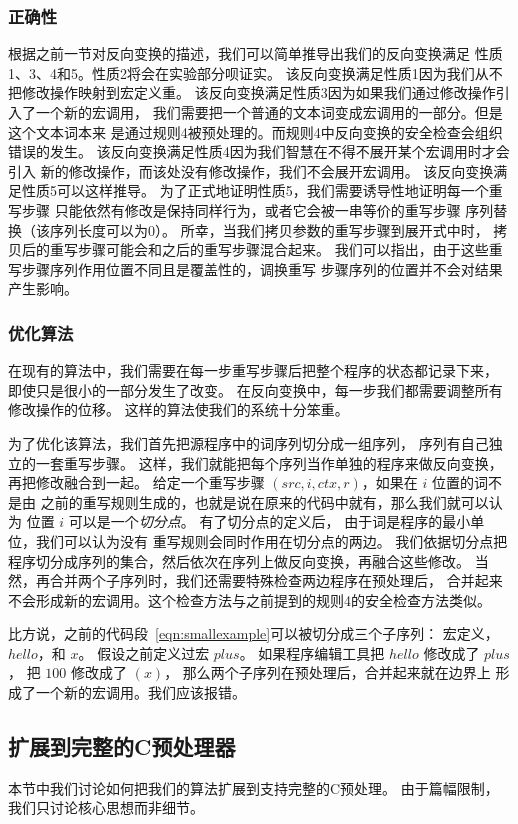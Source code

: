 \subsubsection{正确性}\label{sec:correctness}
根据之前一节对反向变换的描述，我们可以简单推导出我们的反向变换满足
性质1、3、4和5。性质2将会在实验部分呗证实。
该反向变换满足性质1因为我们从不把修改操作映射到宏定义重。
该反向变换满足性质3因为如果我们通过修改操作引入了一个新的宏调用，
我们需要把一个普通的文本词变成宏调用的一部分。但是这个文本词本来
是通过规则4被预处理的。而规则4中反向变换的安全检查会组织错误的发生。
该反向变换满足性质4因为我们智慧在不得不展开某个宏调用时才会引入
新的修改操作，而该处没有修改操作，我们不会展开宏调用。
该反向变换满足性质5可以这样推导。
为了正式地证明性质5，我们需要诱导性地证明每一个重写步骤
只能依然有修改是保持同样行为，或者它会被一串等价的重写步骤
序列替换（该序列长度可以为0）。
所幸，当我们拷贝参数的重写步骤到展开式中时，
拷贝后的重写步骤可能会和之后的重写步骤混合起来。
我们可以指出，由于这些重写步骤序列作用位置不同且是覆盖性的，调换重写
步骤序列的位置并不会对结果产生影响。

\subsubsection{优化算法}\label{sec:optimization}
在现有的算法中，我们需要在每一步重写步骤后把整个程序的状态都记录下来，
即使只是很小的一部分发生了改变。
在反向变换中，每一步我们都需要调整所有修改操作的位移。
这样的算法使我们的系统十分笨重。

为了优化该算法，我们首先把源程序中的词序列切分成一组序列，
序列有自己独立的一套重写步骤。
这样，我们就能把每个序列当作单独的程序来做反向变换，再把修改融合到一起。
给定一个重写步骤 $(src, i, ctx, r)$，如果在 $i$ 位置的词不是由
之前的重写规则生成的，也就是说在原来的代码中就有，那么我们就可以认为
位置 $i$ 可以是一个\emph{切分点}。
有了切分点的定义后， 由于词是程序的最小单位，我们可以认为没有
重写规则会同时作用在切分点的两边。
我们依据切分点把程序切分成序列的集合，然后依次在序列上做反向变换，再融合这些修改。
当然，再合并两个子序列时，我们还需要特殊检查两边程序在预处理后，
合并起来不会形成新的宏调用。这个检查方法与之前提到的规则4的安全检查方法类似。

比方说，之前的代码段~\ref{eqn:smallexample}可以被切分成三个子序列：
宏定义， $hello$，和 $x$。
假设之前定义过宏 $plus$。 如果程序编辑工具把 $hello$ 修改成了 $plus$，
把 $100$ 修改成了 $(x)$， 那么两个子序列在预处理后，合并起来就在边界上
形成了一个新的宏调用。我们应该报错。


\subsection{扩展到完整的C预处理器}\label{sec:fullC}
本节中我们讨论如何把我们的算法扩展到支持完整的C预处理。
由于篇幅限制，我们只讨论核心思想而非细节。

